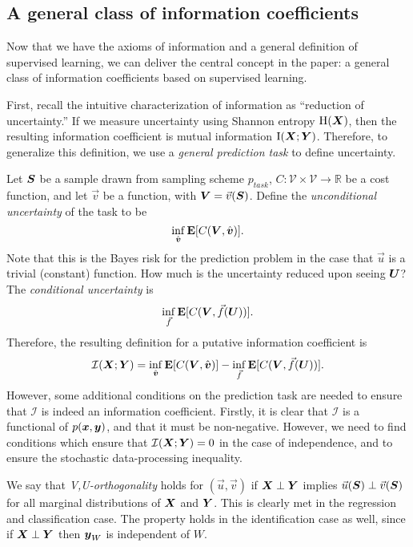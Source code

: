 \documentclass[12pt]{article}
\begin{document}
\subsection{A general class of information coefficients}\label{sec:gen_class_sub}

Now that we have the axioms of information and a general definition of
supervised learning, we can deliver the central concept in the paper:
a general class of information coefficients based on supervised
learning.

First, recall the intuitive characterization of information as
``reduction of uncertainty.''  If we measure uncertainty using Shannon
entropy $\text{H}(\boldsymbol{X})$, then the resulting information coefficient is
mutual information $\text{I}(\boldsymbol{X}; \boldsymbol{Y})$.  Therefore, to generalize
this definition, we use a \emph{general prediction task} to define
uncertainty.

Let $\boldsymbol{S}$ be a sample drawn from sampling scheme $p_{task}$,
$C: \mathcal{V} \times \mathcal{V} \to \mathbb{R}$ be a cost function,
and let $\vec{v}$ be a function, with $\boldsymbol{V} = \vec{v}(\boldsymbol{S})$.  Define
the \emph{unconditional uncertainty} of the task to be
\[
\inf_{\hat{\boldsymbol{v}}} \textbf{E}[C(\boldsymbol{V}, \hat{\boldsymbol{v}})].
\]
Note that this is the Bayes risk for the prediction problem in the
case that $\vec{u}$ is a trivial (constant) function.
How much is the uncertainty reduced upon seeing $\boldsymbol{U}$?
The \emph{conditional uncertainty} is
\[
\inf_{\vec{f}} \textbf{E}[C(\boldsymbol{V}, \vec{f}(\boldsymbol{U}))].
\]
Therefore, the resulting definition for a putative information coefficient is
\[
\mathcal{I}(\boldsymbol{X}; \boldsymbol{Y}) = \inf_{\hat{\boldsymbol{v}}} \textbf{E}[C(\boldsymbol{V}, \hat{\boldsymbol{v}})] - \inf_{\vec{f}} \textbf{E}[C(\boldsymbol{V}, \vec{f}(\boldsymbol{U}))].
\]
However, some additional conditions on the prediction task are needed
to ensure that $\mathcal{I}$ is indeed an information coefficient.
Firstly, it is clear that $\mathcal{I}$ is a functional of
$p(\boldsymbol{x}, \boldsymbol{y})$, and that it must be non-negative.  However, we need to
find conditions which ensure that $\mathcal{I}(\boldsymbol{X}; \boldsymbol{Y}) = 0$ in the
case of independence, and to ensure the stochastic data-processing
inequality.

We say that \emph{V,U-orthogonality} holds for $(\vec{u}, \vec{v})$ if
$\boldsymbol{X} \perp \boldsymbol{Y}$ implies $\vec{u}(\boldsymbol{S}) \perp \vec{v}(\boldsymbol{S})$ for all
marginal distributions of $\boldsymbol{X}$ and $\boldsymbol{Y}$.  
This is clearly met in the regression and classification case.  The
property holds in the identification case as well, since if
$\boldsymbol{X} \perp \boldsymbol{Y}$ then $\boldsymbol{y}_W$ is independent of $W$.
\end{document}
